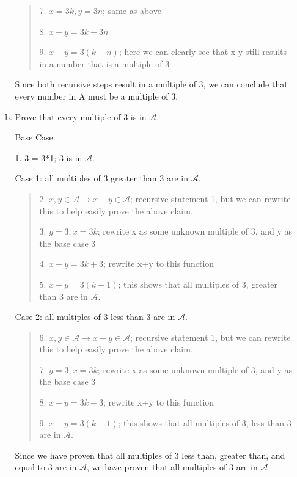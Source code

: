 \documentclass[11pt]{article}
\begin{document}
\begin{itemize}
\begin{enumerate}[(a)]
\begin{quote}
7. $x = 3k, y = 3n$; same as above

8. $x-y = 3k - 3n$

9. $x-y = 3(k-n)$; here we can clearly see that x-y still results in a number that is a multiple of 3 

\end{quote}

Since both recursive steps result in a multiple of 3, we can conclude that every number in A must be a multiple of 3.

\vspace{0.2in}
\item Prove that every multiple of 3 is in $\mathcal{A}$.

Base Case:

1. 3 = 3*1; 3 is in $\mathcal{A} $.

Case 1: all multiples of 3 greater than 3 are in $\mathcal{A}$.

\begin{quote}
2. $x,y \in \mathcal{A} \xrightarrow{} x+y \in \mathcal{A}$; recursive statement 1, but we can rewrite this to help easily prove the above claim.

3. $y = 3, x = 3k$; rewrite x as some unknown multiple of 3, and y as the base case 3

4. $x+y = 3k + 3$; rewrite x+y to this function

5. $x+y = 3(k+1)$; this shows that all multiples of 3, greater than 3 are in $\mathcal{A}$.
\end{quote}

Case 2: all multiples of 3 less than 3 are in $\mathcal{A}$.

\begin{quote}
6. $x,y \in \mathcal{A} \xrightarrow{} x-y \in \mathcal{A}$; recursive statement 1, but we can rewrite this to help easily prove the above claim.

7. $y = 3, x = 3k$; rewrite x as some unknown multiple of 3, and y as the base case 3

8. $x+y = 3k - 3$; rewrite x+y to this function

9. $x+y = 3(k-1)$; this shows that all multiples of 3, less than 3 are in $\mathcal{A}$.
\end{quote}

Since we have proven that all multiples of 3 less than, greater than, and equal to 3 are in $\mathcal{A}$, we have proven that all multiples of 3 are in $\mathcal{A}$ 

\end{enumerate}


\end{itemize}
\end{document}
